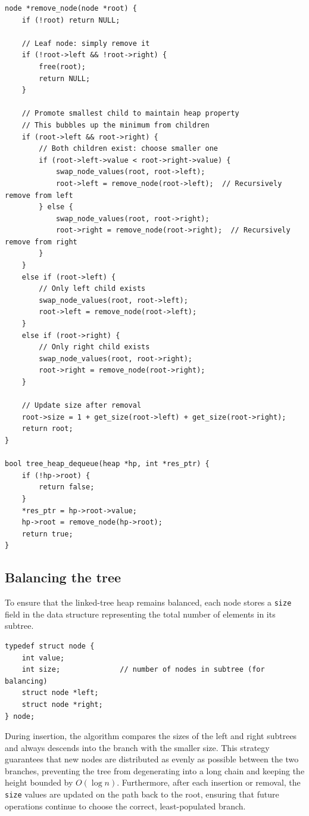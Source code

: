 \documentclass[a4paper,11pt]{article}
\begin{document}
\begin{verbatim}
node *remove_node(node *root) {
    if (!root) return NULL;

    // Leaf node: simply remove it
    if (!root->left && !root->right) {
        free(root);
        return NULL;
    }

    // Promote smallest child to maintain heap property
    // This bubbles up the minimum from children
    if (root->left && root->right) {
        // Both children exist: choose smaller one
        if (root->left->value < root->right->value) {
            swap_node_values(root, root->left);
            root->left = remove_node(root->left);  // Recursively remove from left
        } else {
            swap_node_values(root, root->right);
            root->right = remove_node(root->right);  // Recursively remove from right
        }
    }
    else if (root->left) {
        // Only left child exists
        swap_node_values(root, root->left);
        root->left = remove_node(root->left);
    }
    else if (root->right) {
        // Only right child exists
        swap_node_values(root, root->right);
        root->right = remove_node(root->right);
    }

    // Update size after removal
    root->size = 1 + get_size(root->left) + get_size(root->right);
    return root;
}

bool tree_heap_dequeue(heap *hp, int *res_ptr) {
    if (!hp->root) {
        return false;
    }
    *res_ptr = hp->root->value;
    hp->root = remove_node(hp->root);
    return true;
}
\end{verbatim}

\subsection*{Balancing the tree}

To ensure that the linked-tree heap remains balanced, each node stores a \texttt{size} field in the data structure representing the total number of elements in its subtree. 

\begin{verbatim}
typedef struct node {
    int value;
    int size;              // number of nodes in subtree (for balancing)
    struct node *left;
    struct node *right;
} node;
\end{verbatim}

During insertion, the algorithm compares the sizes of the left and right subtrees and always descends into the branch with the smaller size. This strategy guarantees that new nodes are distributed as evenly as possible between the two branches, preventing the tree from degenerating into a long chain and keeping the height bounded by $O(\log n)$.
Furthermore, after each insertion or removal, the \texttt{size} values are updated on the path back to the root, ensuring that future operations continue to choose the correct, least-populated branch.
\end{document}
